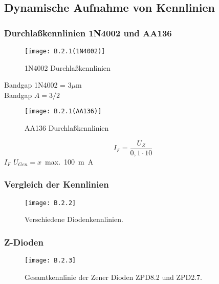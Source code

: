 \documentclass[
	a4paper, %
	12pt, %
]{CSUniSchoolLabReport}
\newcommand{\micro}{\ensuremath{\mu}}
\newcommand{\milli}{m}
\begin{document}
\subsection{Dynamische Aufnahme von Kennlinien}

\subsubsection{Durchlaßkennlinien 1N4002 und AA136}
\begin{figure}[H] %
	\centering %
	\texttt{[image: B.2.1(1N4002)]} %
	\caption{1N4002 Durchlaßkennlinien}
\end{figure}
Bandgap 1N4002 = 3\micro m  
\\
Bandgap $A = 3/2$
\begin{figure}[H] %
	\centering %
	\texttt{[image: B.2.1(AA136)]} %
	\caption{AA136 Durchlaßkennlinien}
\end{figure}


\[
I_F = \frac{U_Z}{0,1 \cdot 10}
\]
$I_{F}$ 
$U_{Gen}= x$\ max.\ \SI{100}{\milli\ampere}
\subsubsection{Vergleich der Kennlinien}
\begin{figure}[H] %
	\centering %
	\texttt{[image: B.2.2]} %
	\caption{Verschiedene Diodenkennlinien.}
\end{figure}

\subsubsection{Z-Dioden}

\begin{figure}[H] %
	\centering %
	\texttt{[image: B.2.3]} %
	\caption{Gesamtkennlinie der Zener Dioden ZPD8.2 und ZPD2.7.}
\end{figure}
\end{document}
